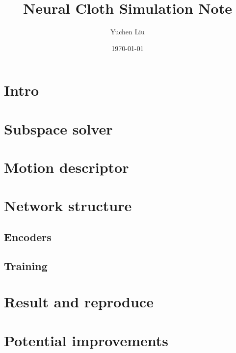 \documentclass{article}
\title{Neural Cloth Simulation\cite{10.1145/3550454.3555491} Note}
\author{Yuchen Liu}
\date{\today}
\begin{document}
\maketitle

\section{Intro}
\section{Subspace solver}
\section{Motion descriptor}
\section{Network structure}
\subsection{Encoders}
\subsection{Training}
\section{Result and reproduce}
\section{Potential improvements}



\end{document}
